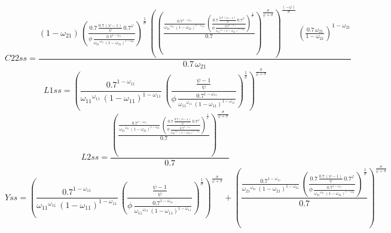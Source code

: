 \begin{dmath*}
C22ss = \frac{\left(1-{{\omega_{21}}}\right)\, \left(\frac{0.7\, \frac{0.7\, \left({{\psi}}-1\right)}{{{\psi}}}\, 0.7^{{{\varphi}}}}{{{\phi}}\, \frac{0.7^{1-{{\omega_{11}}}}}{{{\omega_{21}}}^{{{\omega_{21}}}}\, \left(1-{{\omega_{21}}}\right)^{1-{{\omega_{21}}}}}}\right)^{\frac{1}{{{\sigma}}}}\, \left(\left(\frac{\frac{0.7^{1-{{\omega_{11}}}}}{{{\omega_{21}}}^{{{\omega_{21}}}}\, \left(1-{{\omega_{21}}}\right)^{1-{{\omega_{21}}}}}\, \left(\frac{0.7\, \frac{0.7\, \left({{\psi}}-1\right)}{{{\psi}}}\, 0.7^{{{\varphi}}}}{{{\phi}}\, \frac{0.7^{1-{{\omega_{11}}}}}{{{\omega_{21}}}^{{{\omega_{21}}}}\, \left(1-{{\omega_{21}}}\right)^{1-{{\omega_{21}}}}}}\right)^{\frac{1}{{{\sigma}}}}}{0.7}\right)^{\frac{{{\sigma}}}{{{\varphi}}+{{\sigma}}}}\right)^{\frac{\left(-{{\varphi}}\right)}{{{\sigma}}}}\, \left(\frac{0.7\, {{\omega_{21}}}}{1-{{\omega_{21}}}}\right)^{1-{{\omega_{21}}}}}{0.7\, {{\omega_{21}}}}
\end{dmath*}
\begin{dmath*}
L1ss = \left(\frac{0.7^{1-{{\omega_{11}}}}}{{{\omega_{11}}}^{{{\omega_{11}}}}\, \left(1-{{\omega_{11}}}\right)^{1-{{\omega_{11}}}}}\, \left(\frac{\frac{{{\psi}}-1}{{{\psi}}}}{{{\phi}}\, \frac{0.7^{1-{{\omega_{11}}}}}{{{\omega_{11}}}^{{{\omega_{11}}}}\, \left(1-{{\omega_{11}}}\right)^{1-{{\omega_{11}}}}}}\right)^{\frac{1}{{{\sigma}}}}\right)^{\frac{{{\sigma}}}{{{\varphi}}+{{\sigma}}}}
\end{dmath*}
\begin{dmath*}
L2ss = \frac{\left(\frac{\frac{0.7^{1-{{\omega_{11}}}}}{{{\omega_{21}}}^{{{\omega_{21}}}}\, \left(1-{{\omega_{21}}}\right)^{1-{{\omega_{21}}}}}\, \left(\frac{0.7\, \frac{0.7\, \left({{\psi}}-1\right)}{{{\psi}}}\, 0.7^{{{\varphi}}}}{{{\phi}}\, \frac{0.7^{1-{{\omega_{11}}}}}{{{\omega_{21}}}^{{{\omega_{21}}}}\, \left(1-{{\omega_{21}}}\right)^{1-{{\omega_{21}}}}}}\right)^{\frac{1}{{{\sigma}}}}}{0.7}\right)^{\frac{{{\sigma}}}{{{\varphi}}+{{\sigma}}}}}{0.7}
\end{dmath*}
\begin{dmath*}
Yss = \left(\frac{0.7^{1-{{\omega_{11}}}}}{{{\omega_{11}}}^{{{\omega_{11}}}}\, \left(1-{{\omega_{11}}}\right)^{1-{{\omega_{11}}}}}\, \left(\frac{\frac{{{\psi}}-1}{{{\psi}}}}{{{\phi}}\, \frac{0.7^{1-{{\omega_{11}}}}}{{{\omega_{11}}}^{{{\omega_{11}}}}\, \left(1-{{\omega_{11}}}\right)^{1-{{\omega_{11}}}}}}\right)^{\frac{1}{{{\sigma}}}}\right)^{\frac{{{\sigma}}}{{{\varphi}}+{{\sigma}}}}+\left(\frac{\frac{0.7^{1-{{\omega_{11}}}}}{{{\omega_{21}}}^{{{\omega_{21}}}}\, \left(1-{{\omega_{21}}}\right)^{1-{{\omega_{21}}}}}\, \left(\frac{0.7\, \frac{0.7\, \left({{\psi}}-1\right)}{{{\psi}}}\, 0.7^{{{\varphi}}}}{{{\phi}}\, \frac{0.7^{1-{{\omega_{11}}}}}{{{\omega_{21}}}^{{{\omega_{21}}}}\, \left(1-{{\omega_{21}}}\right)^{1-{{\omega_{21}}}}}}\right)^{\frac{1}{{{\sigma}}}}}{0.7}\right)^{\frac{{{\sigma}}}{{{\varphi}}+{{\sigma}}}}
\end{dmath*}
